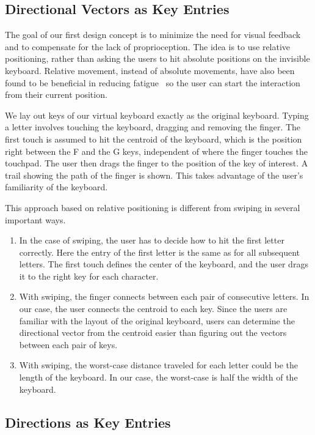 \subsection{Directional Vectors as Key Entries}

The goal of our first design concept is to minimize the need for visual feedback and to  
compensate for the lack of proprioception.  The idea is to use relative positioning, rather than asking the users to hit absolute positions on the invisible keyboard. Relative movement, instead of absolute movements, have also been found to be beneficial in reducing fatigue~\cite{Hincapie-Ramos:2014:CEM:2556288.2557130} so the user can start the interaction from their current position. 

We lay out keys of our virtual keyboard exactly as the original keyboard.  Typing a letter involves touching the keyboard, dragging and removing the finger.  The first touch is assumed to hit the centroid of the keyboard, which is the position right between the F and the G keys, independent of where the finger touches the touchpad.  The user then drags the finger to the position of the key of interest.  A trail showing the path of the finger is shown.   This takes advantage of the user’s familiarity of the keyboard.  

This approach based on relative positioning is different from swiping in several important ways. 
\begin{enumerate}
\item
In the case of swiping, the user has to decide how to hit the first letter correctly.  Here the entry of the first letter is the same as for all subsequent letters.  The first touch defines the center of the keyboard, and the user drags it to the right key for each character.   
\item
With swiping, the finger connects between each pair of consecutive letters.  In our case, the user connects the centroid to each key.   Since the users are familiar with the layout of the original keyboard, users can determine the directional vector from the centroid easier than figuring out the vectors between each pair of keys. 
\item 
With swiping, the worst-case distance traveled for each letter could be the length of the keyboard.  In our case, the worst-case is half the width of the keyboard. 
\end{enumerate}

\subsection{Directions as Key Entries}

